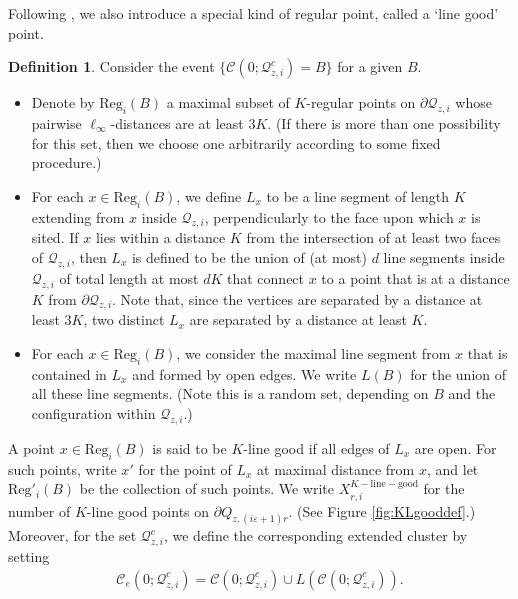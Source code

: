 \documentclass[11pt]{article}
\theoremstyle{definition}
\theoremstyle{remark}
\numberwithin{equation}{section}
\theoremstyle{plain}
\theoremstyle{definition}
\newtheorem{defn}[theorem]{Definition}
\theoremstyle{remark}
\theoremstyle{plain}
\begin{document}
Following \cite{ASS}, we also introduce a special kind of regular point, called a `line good' point.

\begin{defn}\label{def:KLgood}
Consider the event $\{\mathcal C(0; \mathcal Q_{z, i}^c)=B\}$ for a given $B$.
\begin{itemize}
\item Denote by $\mathrm{Reg}_i(B)$ a maximal subset of $K$-regular points on $\partial \mathcal Q_{z, i}$ whose pairwise $\ell_\infty$-distances are at least $3K$. (If there is more than one possibility for this set, then we choose one arbitrarily according to some fixed procedure.)
\item For each $x \in  \mathrm{Reg}_i(B)$, we define $L_x$ to be a line segment of length $K$ extending from $x$ inside $\mathcal Q_{z, i}$, perpendicularly to the face upon which $x$ is sited. If $x$ lies within a distance $K$ from the intersection of at least two faces of $\mathcal Q_{z, i}$, then $L_x$ is defined to be the union of (at most) $d$ line segments inside $\mathcal Q_{z, i}$ of total length at most $dK$ that connect $x$ to a point that is at a distance $K$ from $\partial \mathcal Q_{z, i}$. Note that, since the vertices are separated by a distance at least $3K$, two distinct $L_x$ are separated by a distance at least $K$.
\item For each $x \in  \mathrm{Reg}_i(B)$, we consider the maximal line segment from $x$ that is contained in $L_x$ and formed by open edges. We write $L(B)$ for the union of all these line segments. (Note this is a random set, depending on $B$ and the configuration within $\mathcal Q_{z, i}$.)
\end{itemize}
A point $x\in \mathrm{Reg}_i(B)$ is said to be $K$-line good if all edges of $L_x$ are open. For such points, write $x'$ for the point of $L_x$ at maximal distance from $x$, and let $\mathrm{Reg}'_i(B)$ be the collection of such points. We write $X_{r,i}^{K-\mathrm{line-good}}$ for the number of $K$-line good points on $\partial Q_{z, (i\varepsilon+1)r}$. (See Figure \ref{fig:KLgooddef}.) Moreover, for the set $\mathcal Q_{z, i}^c$, we define the corresponding extended cluster by setting
\begin{align}
\mathcal C_e(0; \mathcal Q_{z, i}^c)=\mathcal C(0;\mathcal Q_{z, i}^c)\cup L(\mathcal C(0;\mathcal Q_{z, i}^c)). \label{extclust}
\end{align}
\end{defn}
\end{document}

